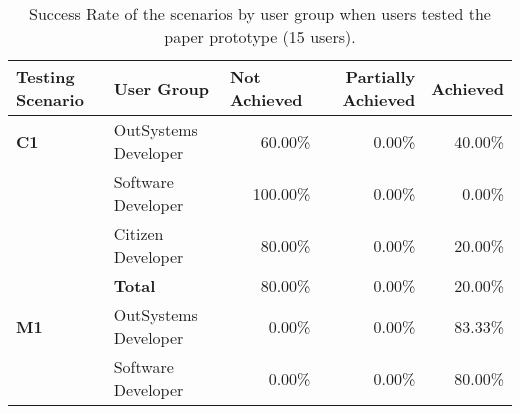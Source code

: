 \begin{table}[tb]
  \caption{Success Rate of the scenarios by user group when users tested the paper prototype (15 users).}
    \label{tab:effectiveness_paper_prototype}
  \begin{tabular}{llrrr}
  \hline
  \rowcolor[HTML]{EFEFEF} 
  \textbf{Testing Scenario} & \textbf{User Group}  & \multicolumn{1}{l}{\cellcolor[HTML]{EFEFEF}\textbf{Not Achieved}} & \multicolumn{1}{C{2cm}}{\cellcolor[HTML]{EFEFEF}\textbf{Partially Achieved}} & \multicolumn{1}{l}{\cellcolor[HTML]{EFEFEF}\textbf{Achieved}} \\ \hline
  \textbf{C1}               & OutSystems Developer & 60.00\%                                                           & 0.00\%                                                                  & 40.00\%                                                       \\
                            & Software Developer   & 100.00\%                                                          & 0.00\%                                                                  & 0.00\%                                                        \\
                            & Citizen Developer    & 80.00\%                                                           & 0.00\%                                                                  & 20.00\%                                                       \\
                            & \textbf{Total}       & 80.00\%                                                           & 0.00\%                                                                  & 20.00\%                                                       \\ \hline
  \textbf{M1}               & OutSystems Developer & 0.00\%                                                            & 0.00\%                                                                  & 83.33\%                                                       \\
                            & Software Developer   & 0.00\%                                                            & 0.00\%                                                                  & 80.00\%                                                       \\

\end{tabular}
\end{table}
